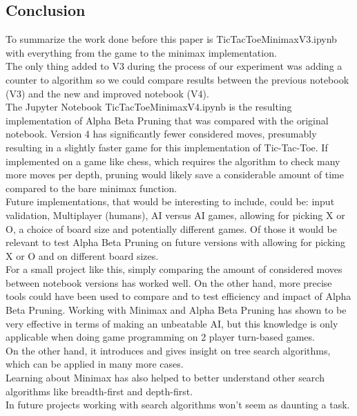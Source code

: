\subsection{Conclusion}
To summarize the work done before this paper is TicTacToe\textunderscore MinimaxV3.ipynb with everything from the game to the minimax implementation.\\
The only thing added to V3 during the process of our experiment was adding a counter to algorithm so we could compare results between the previous notebook (V3) and the new and improved notebook (V4).\\
The Jupyter Notebook TicTacToe\textunderscore MinimaxV4.ipynb is the resulting implementation of 
Alpha Beta Pruning that was compared with the original notebook.
Version 4 has significantly fewer considered moves, presumably resulting in a slightly faster game 
for this implementation of Tic-Tac-Toe.
If implemented on a game like chess, which requires the algorithm to check many more moves per depth, 
pruning would likely save a considerable amount of time compared to the bare minimax function.\\
Future implementations, that would be interesting to include, could be: input validation, Multiplayer (humans), AI versus AI games, allowing for picking X or O, 
a choice of board size and potentially different games. Of those it would be relevant to test Alpha Beta Pruning on future versions 
with allowing for picking X or O and on different board sizes.\\
For a small project like this, simply comparing the amount of considered moves between notebook versions has worked well.
On the other hand, more precise tools could have been used to compare and to test efficiency and impact of Alpha Beta Pruning.
Working with Minimax and Alpha Beta Pruning has shown to be very effective in terms of making an unbeatable AI, 
but this knowledge is only applicable when doing game programming on 2 player turn-based games.\\
On the other hand, it introduces and gives insight on tree search algorithms, which can be applied in many more cases.\\ 
Learning about Minimax has also helped to better understand other search algorithms like breadth-first and depth-first.\\
In future projects working with search algorithms won’t seem as daunting a task.
\clearpage